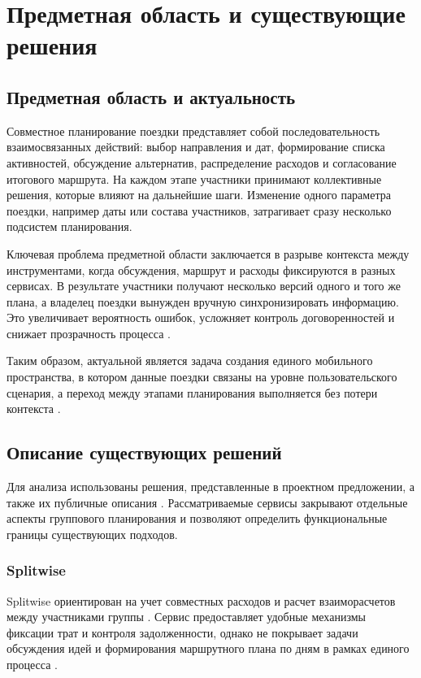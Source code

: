 \section{Предметная область и существующие решения}


\subsection{Предметная область и актуальность}
Совместное планирование поездки представляет собой последовательность взаимосвязанных действий: выбор направления и дат, формирование списка активностей, обсуждение альтернатив, распределение расходов и согласование итогового маршрута. На каждом этапе участники принимают коллективные решения, которые влияют на дальнейшие шаги. Изменение одного параметра поездки, например даты или состава участников, затрагивает сразу несколько подсистем планирования.

Ключевая проблема предметной области заключается в разрыве контекста между инструментами, когда обсуждения, маршрут и расходы фиксируются в разных сервисах. В результате участники получают несколько версий одного и того же плана, а владелец поездки вынужден вручную синхронизировать информацию. Это увеличивает вероятность ошибок, усложняет контроль договоренностей и снижает прозрачность процесса .

Таким образом, актуальной является задача создания единого мобильного пространства, в котором данные поездки связаны на уровне пользовательского сценария, а переход между этапами планирования выполняется без потери контекста .

\subsection{Описание существующих решений}
Для анализа использованы решения, представленные в проектном предложении, а также их публичные описания . Рассматриваемые сервисы закрывают отдельные аспекты группового планирования и позволяют определить функциональные границы существующих подходов.

\subsubsection{Splitwise}
Splitwise ориентирован на учет совместных расходов и расчет взаиморасчетов между участниками группы . Сервис предоставляет удобные механизмы фиксации трат и контроля задолженности, однако не покрывает задачи обсуждения идей и формирования маршрутного плана по дням в рамках единого процесса .

